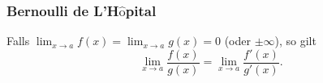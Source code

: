 \subsubsection{Bernoulli de L'H$\hat{\textrm{o}}$pital}
    Falls $\displaystyle \lim_{x \to a} f(x) = \lim_{x \to a} g(x) = 0$ (oder $\pm \infty$), so gilt
    $$
         \lim_{x \to a} \frac{f(x)}{g(x)} = \lim_{x \to a} \frac{f'(x)}{g'(x)}.
    $$